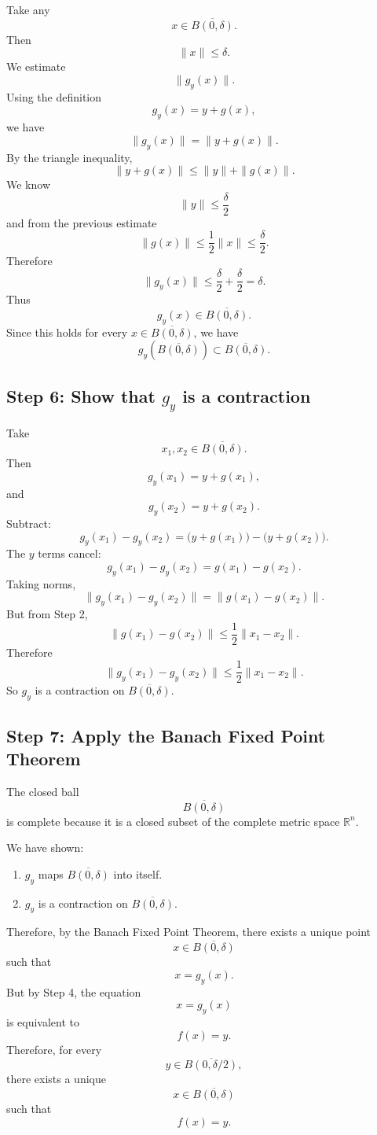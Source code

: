 \documentclass[11pt]{article}
\begin{document}
Take any
\[
x\in \overline{B(0,\delta)}.
\]
Then
\[
\|x\|\le \delta.
\]
We estimate
\[
\|g_y(x)\|.
\]
Using the definition
\[
g_y(x)=y+g(x),
\]
we have
\[
\|g_y(x)\|=\|y+g(x)\|.
\]
By the triangle inequality,
\[
\|y+g(x)\|\le \|y\|+\|g(x)\|.
\]
We know
\[
\|y\|\le \frac{\delta}{2}
\]
and from the previous estimate
\[
\|g(x)\|\le \frac12\|x\|\le \frac{\delta}{2}.
\]
Therefore
\[
\|g_y(x)\|
\le
\frac{\delta}{2}+\frac{\delta}{2}
=
\delta.
\]
Thus
\[
g_y(x)\in \overline{B(0,\delta)}.
\]
Since this holds for every $x\in \overline{B(0,\delta)}$, we have
\[
g_y(\overline{B(0,\delta)})\subset \overline{B(0,\delta)}.
\]

\subsection*{Step 6: Show that $g_y$ is a contraction}

Take
\[
x_1,x_2\in \overline{B(0,\delta)}.
\]
Then
\[
g_y(x_1)=y+g(x_1),
\]
and
\[
g_y(x_2)=y+g(x_2).
\]
Subtract:
\[
g_y(x_1)-g_y(x_2)
=
\bigl(y+g(x_1)\bigr)-\bigl(y+g(x_2)\bigr).
\]
The $y$ terms cancel:
\[
g_y(x_1)-g_y(x_2)=g(x_1)-g(x_2).
\]
Taking norms,
\[
\|g_y(x_1)-g_y(x_2)\|
=
\|g(x_1)-g(x_2)\|.
\]
But from Step 2,
\[
\|g(x_1)-g(x_2)\|
\le
\frac12\|x_1-x_2\|.
\]
Therefore
\[
\|g_y(x_1)-g_y(x_2)\|
\le
\frac12\|x_1-x_2\|.
\]
So $g_y$ is a contraction on $\overline{B(0,\delta)}$.

\subsection*{Step 7: Apply the Banach Fixed Point Theorem}

The closed ball
\[
\overline{B(0,\delta)}
\]
is complete because it is a closed subset of the complete metric space $\mathbb R^n$.

We have shown:
\begin{enumerate}[leftmargin=2em]
\item $g_y$ maps $\overline{B(0,\delta)}$ into itself.
\item $g_y$ is a contraction on $\overline{B(0,\delta)}$.
\end{enumerate}

Therefore, by the Banach Fixed Point Theorem, there exists a unique point
\[
x\in \overline{B(0,\delta)}
\]
such that
\[
x=g_y(x).
\]
But by Step 4, the equation
\[
x=g_y(x)
\]
is equivalent to
\[
f(x)=y.
\]
Therefore, for every
\[
y\in \overline{B(0,\delta/2)},
\]
there exists a unique
\[
x\in \overline{B(0,\delta)}
\]
such that
\[
f(x)=y.
\]
\end{document}
